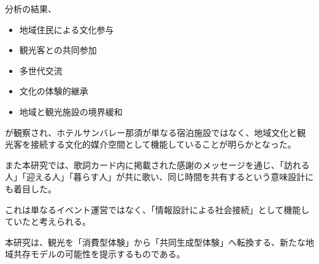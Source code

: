 分析の結果、

\begin{itemize}
\item 地域住民による文化参与
\item 観光客との共同参加
\item 多世代交流
\item 文化の体験的継承
\item 地域と観光施設の境界緩和
\end{itemize}

が観察され、ホテルサンバレー那須が単なる宿泊施設ではなく、地域文化と観光客を接続する文化的媒介空間として機能していることが明らかとなった。

また本研究では、歌詞カード内に掲載された感謝のメッセージを通じ、「訪れる人」「迎える人」「暮らす人」が共に歌い、同じ時間を共有するという意味設計にも着目した。

これは単なるイベント運営ではなく、「情報設計による社会接続」として機能していたと考えられる。

本研究は、観光を「消費型体験」から「共同生成型体験」へ転換する、新たな地域共存モデルの可能性を提示するものである。
